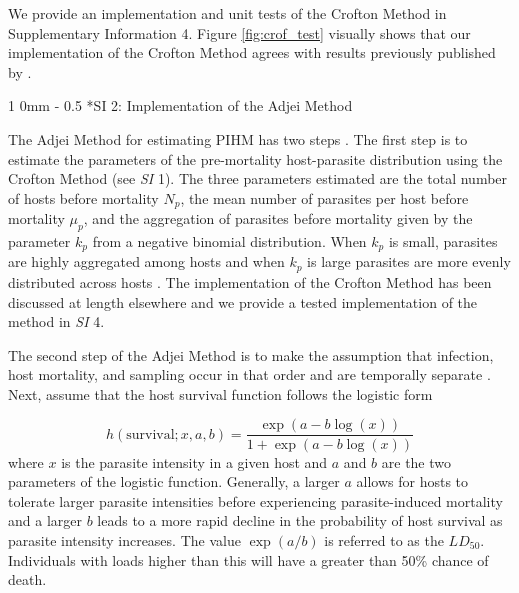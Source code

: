 \documentclass[12pt, a4paper]{article}
\makeatletter
\renewcommand{\section}{\@startsection
{section}%
{1}%
{0mm}%
{-\baselineskip}%
{0.5\baselineskip}%
{\normalfont\bf\large}} %
\makeatother
\begin{document}
We provide an implementation and unit tests of the Crofton Method in  Supplementary Information 4.  Figure \ref{fig:crof_test} visually shows that our implementation of the Crofton Method agrees with results previously published by \cite{Crofton1971a}.

\section*{SI 2: Implementation of the Adjei Method}

The Adjei Method for estimating PIHM has two steps \citep{Adjei1986}.  The first
step is to estimate the parameters of the pre-mortality host-parasite
distribution using the Crofton Method (see \emph{SI} 1).  The three parameters estimated are the
total number of hosts before mortality $N_p$,  the mean number of parasites per
host before mortality $\mu_p$, and the aggregation of parasites before
mortality given by the parameter $k_p$ from a negative binomial distribution.
When $k_p$ is small, parasites are highly aggregated among hosts and when
$k_p$ is large parasites are more evenly distributed across hosts \citep{Wilson2002}.  The implementation of the Crofton Method has been discussed at length elsewhere \citep[e.g.][ and in \emph{SI} 1]{Royce1990,Lester1984} and we provide a tested implementation of the method in \emph{SI} 4.

The second step of the Adjei Method is to make the assumption that infection, host mortality, and sampling occur in that order and are temporally separate \citep{Adjei1986}. Next, \citeauthor{Adjei1986} assume that the host survival function follows the logistic form

\begin{equation}
    h(\text{survival}; x, a, b) = \dfrac{\exp{(a - b \log(x))}}{1 + \exp{(a - b \log(x))}}
    \label{eq:logistic}
\end{equation}
where $x$ is the parasite intensity in a given host and $a$ and $b$ are the two
parameters of the logistic function. Generally, a larger $a$ allows for hosts to
tolerate larger parasite intensities before experiencing parasite-induced mortality
and a larger $b$ leads to a more rapid decline in the probability of host
survival as parasite intensity increases. The value $\exp(a / b)$ is referred
to as the $LD_{50}$. Individuals with loads higher than this will have a greater than 50\% chance of death.
\end{document}
